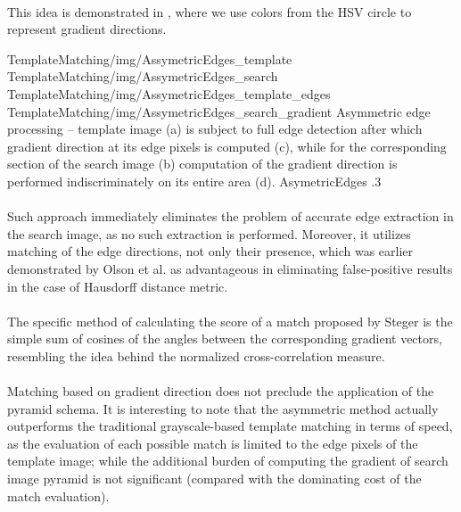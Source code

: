 \paragraph*{}
This idea is demonstrated in , where we use colors from the HSV circle to represent gradient directions.

\fourFigures
{TemplateMatching/img/AssymetricEdges_template}
{TemplateMatching/img/AssymetricEdges_search}
{TemplateMatching/img/AssymetricEdges_template_edges}
{TemplateMatching/img/AssymetricEdges_search_gradient}
{Asymmetric edge processing -- template image (a) is subject to full edge detection after which gradient direction at its edge pixels is computed (c), while for the corresponding section of the search image (b) computation of the gradient direction is performed indiscriminately on its entire area (d).}
{AsymetricEdges}
{.3\textwidth}

\paragraph*{}
Such approach immediately eliminates the problem of accurate edge extraction in the search image, as no such extraction is performed. Moreover, it utilizes matching of the edge directions, not only their presence, which was earlier demonstrated\cite{Olson97} by Olson et al. as advantageous in eliminating false-positive results in the case of Hausdorff distance metric.

\paragraph*{}
The specific method of calculating the score of a match proposed by Steger is the simple sum of cosines of the angles between the corresponding gradient vectors, resembling the idea behind the normalized cross-correlation measure.

\paragraph*{}
Matching based on gradient direction does not preclude the application of the pyramid schema. It is interesting to note that the asymmetric method actually outperforms the traditional grayscale-based template matching in terms of speed, as the evaluation of each possible match is limited to the edge pixels of the template image; while the additional burden of computing the gradient of search image pyramid is not significant (compared with the dominating cost of the match evaluation).

